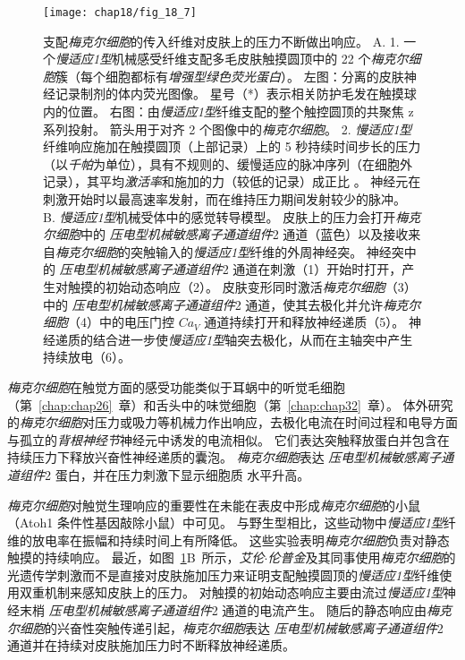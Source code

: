 \begin{figure}[htbp]
	\centering
	\texttt{[image: chap18/fig\_18\_7]}
	\caption{支配\textit{梅克尔细胞}的传入纤维对皮肤上的压力不断做出响应。
		A. 1. 一个\textit{慢适应1型}机械感受纤维支配多毛皮肤触摸圆顶中的 22 个\textit{梅克尔细胞}簇（每个细胞都标有\textit{增强型绿色荧光蛋白}）。
		左图：分离的皮肤神经记录制剂的体内荧光图像。
		星号（*）表示相关防护毛发在触摸球内的位置。
		右图：由\textit{慢适应1型}纤维支配的整个触控圆顶的共聚焦 z 系列投射。
		箭头用于对齐 2 个图像中的\textit{梅克尔细胞}。
		2. \textit{慢适应1型}纤维响应施加在触摸圆顶（上部记录）上的 5 秒持续时间步长的压力（以\textit{千帕}为单位），具有不规则的、缓慢适应的脉冲序列（在细胞外记录），其平均\textit{激活率}和施加的力（较低的记录）成正比 。
		神经元在刺激开始时以最高速率发射，而在维持压力期间发射较少的脉冲。
		B. \textit{慢适应1型}机械受体中的感觉转导模型。
		皮肤上的压力会打开\textit{梅克尔细胞}中的 \textit{压电型机械敏感离子通道组件}2 通道（蓝色）以及接收来自\textit{梅克尔细胞}的突触输入的\textit{慢适应1型}纤维的外周神经突。
		神经突中的 \textit{压电型机械敏感离子通道组件}2 通道在刺激（1）开始时打开，产生对触摸的初始动态响应（2）。
		皮肤变形同时激活\textit{梅克尔细胞}（3）中的 \textit{压电型机械敏感离子通道组件}2 通道，使其去极化并允许\textit{梅克尔细胞}（4）中的电压门控 $Ca_V$ 通道持续打开和释放神经递质（5）。
		神经递质的结合进一步使\textit{慢适应1型}轴突去极化，从而在主轴突中产生持续放电（6）\cite{maksimovic2014epidermal}。}
	\label{fig:18_7}
\end{figure}


\textit{梅克尔细胞}在触觉方面的感受功能类似于耳蜗中的听觉毛细胞（第~\ref{chap:chap26}~章）和舌头中的味觉细胞（第~\ref{chap:chap32}~章）。
体外研究的\textit{梅克尔细胞}对压力或吸力等机械力作出响应，去极化电流在时间过程和电导方面与孤立的\textit{背根神经节}神经元中诱发的电流相似。
它们表达突触释放蛋白并包含在持续压力下释放兴奋性神经递质的囊泡。
\textit{梅克尔细胞}表达 \textit{压电型机械敏感离子通道组件}2 蛋白，并在压力刺激下显示细胞质  水平升高。


\textit{梅克尔细胞}对触觉生理响应的重要性在未能在表皮中形成\textit{梅克尔细胞}的小鼠（Atoh1 条件性基因敲除小鼠）中可见。
与野生型相比，这些动物中\textit{慢适应1型}纤维的放电率在振幅和持续时间上有所降低。
这些实验表明\textit{梅克尔细胞}负责对静态触摸的持续响应。
最近，如图~\ref{fig:18_7}B~所示，\textit{艾伦$\cdot$伦普金}及其同事使用\textit{梅克尔细胞}的光遗传学刺激而不是直接对皮肤施加压力来证明支配触摸圆顶的\textit{慢适应1型}纤维使用双重机制来感知皮肤上的压力。
对触摸的初始动态响应主要由流过\textit{慢适应1型}神经末梢 \textit{压电型机械敏感离子通道组件}2 通道的电流产生。
随后的静态响应由\textit{梅克尔细胞}的兴奋性突触传递引起，\textit{梅克尔细胞}表达 \textit{压电型机械敏感离子通道组件}2 通道并在持续对皮肤施加压力时不断释放神经递质。


